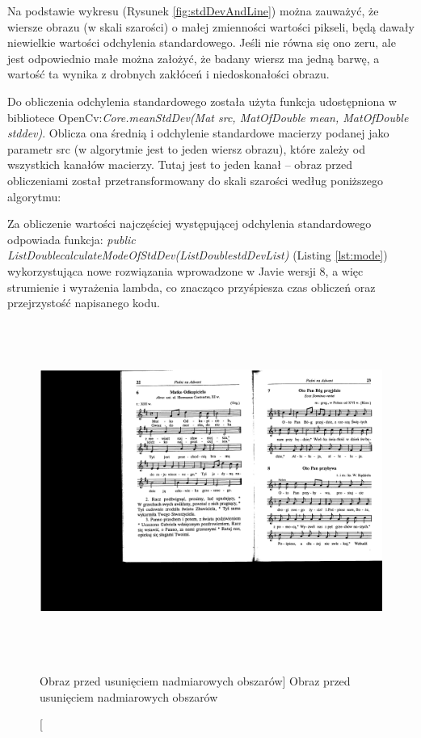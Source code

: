 \documentclass[a4paper,12pt]{article}
\begin{document}
    			Na podstawie wykresu (Rysunek \ref{fig:stdDevAndLine}) można zauważyć, że wiersze obrazu (w skali szarości) o małej zmienności wartości pikseli, będą dawały niewielkie wartości odchylenia standardowego. Jeśli nie równa się ono zeru, ale jest odpowiednio małe można założyć, że badany wiersz ma jedną barwę, a wartość ta wynika z drobnych zakłóceń i niedoskonałości obrazu.
    			
    			Do obliczenia odchylenia standardowego została użyta funkcja udostępniona w bibliotece OpenCv:\textit {Core.meanStdDev(Mat src, MatOfDouble mean, MatOfDouble stddev)}. Oblicza ona średnią i odchylenie standardowe macierzy podanej jako parametr src (w algorytmie jest to jeden wiersz obrazu), które zależy od wszystkich kanałów macierzy. Tutaj jest to jeden kanał -- obraz przed obliczeniami został przetransformowany do skali szarości według poniższego algorytmu:
		 		\newline
			    		
    			 		
    			Za obliczenie wartości najczęściej występującej odchylenia standardowego odpowiada funkcja: \textit {public List\guilsinglleft Double\guilsinglright calculateModeOfStdDev(List\guilsinglleft Double\guilsinglright stdDevList)} (Listing \ref{lst:mode})
    			wykorzystująca nowe rozwiązania wprowadzone w Javie wersji 8, a więc strumienie i wyrażenia lambda, co znacząco przyśpiesza czas obliczeń oraz przejrzystość napisanego kodu. 
    			\newline
			
			    
			
    		    \begin{figure}[!ht]  
    			    \begin{center}
    				    \includegraphics[height=11cm, frame] {image//exampleImage//002_a.png} 
    			    \end{center}
    			    \caption
    			        [Obraz przed usunięciem nadmiarowych obszarów]
        			    {Obraz przed usunięciem nadmiarowych obszarów}  
    		    \end{figure}
    		    
\end{document}
